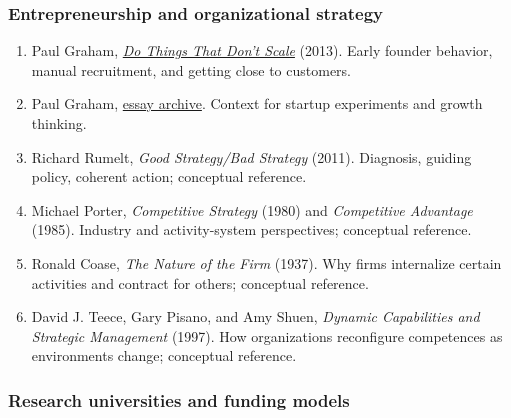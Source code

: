 \subsubsection*{Entrepreneurship and organizational strategy}

\begin{enumerate}[leftmargin=*,itemsep=1.5pt]
  \item Paul Graham, \href{https://paulgraham.com/\allowbreak ds.html}{\textit{Do Things That Don't Scale}} (2013). Early founder behavior, manual recruitment, and getting close to customers.
  \item Paul Graham, \href{https://www.paulgraham.com/\allowbreak articles.html}{essay archive}. Context for startup experiments and growth thinking.
  \item Richard Rumelt, \textit{Good Strategy/\allowbreak Bad Strategy} (2011). Diagnosis, guiding policy, coherent action; conceptual reference.
  \item Michael Porter, \textit{Competitive Strategy} (1980) and \textit{Competitive Advantage} (1985). Industry and activity-system perspectives; conceptual reference.
  \item Ronald Coase, \textit{The Nature of the Firm} (1937). Why firms internalize certain activities and contract for others; conceptual reference.
  \item David J. Teece, Gary Pisano, and Amy Shuen, \textit{Dynamic Capabilities and Strategic Management} (1997). How organizations reconfigure competences as environments change; conceptual reference.
\end{enumerate}

\subsubsection*{Research universities and funding models}

